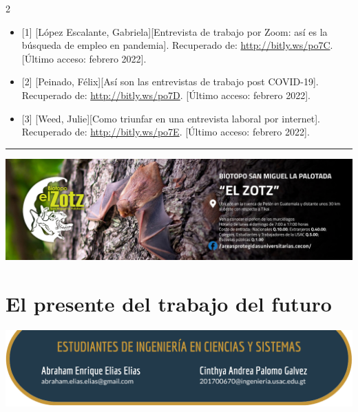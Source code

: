 \documentclass[12pt,spanish,Letterpaper,openany]{book}
\newcommand{\HRule}{\begin{center}\rule{0.5\linewidth}{0.2mm}\end{center}}
\begin{document}
\begin {multicols}{2}
\begin{itemize}
\item
  {[}1{]} {[}López Escalante, Gabriela{]}{[}Entrevista de trabajo por Zoom: así es la búsqueda de empleo en pandemia{]}. Recuperado de: \url{http://bitly.ws/po7C}. {[}Último acceso: febrero 2022{]}.
\item
  {[}2{]} {[}Peinado, Félix{]}{[}Así son las entrevistas de trabajo post COVID-19{]}. Recuperado de: \url{http://bitly.ws/po7D}. {[}Último acceso: febrero 2022{]}.
\item
  {[}3{]} {[}Weed, Julie{]}{[}Como triunfar en una entrevista laboral por internet{]}. Recuperado de: \url{http://bitly.ws/po7E}. {[}Último acceso: febrero 2022{]}.
\end{itemize}

\end {multicols}
\medskip
\HRule
\medskip

\begin{center}\includegraphics[width=1\linewidth]{images/publicidad8} \end{center}

\hypertarget{pareja38}{%
\chapter{El presente del trabajo del futuro}\label{pareja38}}

\begin{center}\includegraphics[width=1\linewidth]{images/pareja38_image1} \end{center}
\end{document}

